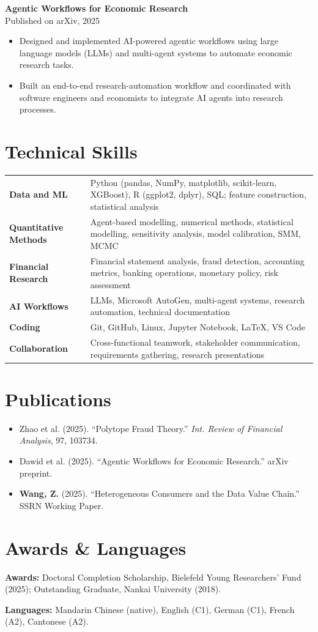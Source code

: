 \documentclass[a4paper,11pt]{article}
\newcommand{\project}[2]{%
  \textbf{#1}\\[-1pt]
  \textcolor{muted}{\small #2}\par
}
\begin{document}
\project{Agentic Workflows for Economic Research}{Published on arXiv, 2025}
\begin{itemize}
  \item Designed and implemented AI-powered agentic workflows using large language models (LLMs) and multi-agent systems to automate economic research tasks.
  \item Built an end-to-end research-automation workflow and coordinated with software engineers and economists to integrate AI agents into research processes.
\end{itemize}

\section{Technical Skills}
\begin{tabularx}{\linewidth}{@{}>{\bfseries}p{3.2cm}X@{}}
Data and ML & Python (pandas, NumPy, matplotlib, scikit-learn, XGBoost), R (ggplot2, dplyr), SQL; feature construction, statistical analysis\\
Quantitative Methods & Agent-based modelling, numerical methods, statistical modelling, sensitivity analysis, model calibration, SMM, MCMC\\
Financial Research & Financial statement analysis, fraud detection, accounting metrics, banking operations, monetary policy, risk assessment\\
AI Workflows & LLMs, Microsoft AutoGen, multi-agent systems, research automation, technical documentation\\
Coding & Git, GitHub, Linux, Jupyter Notebook, LaTeX, VS Code\\
Collaboration & Cross-functional teamwork, stakeholder communication, requirements gathering, research presentations\\
\end{tabularx}

\section{Publications}
\begin{itemize}
  \item Zhao et al. (2025). ``Polytope Fraud Theory.'' \textit{Int. Review of Financial Analysis}, 97, 103734.
  \item Dawid et al. (2025). ``Agentic Workflows for Economic Research.'' arXiv preprint.
  \item \textbf{Wang, Z.} (2025). ``Heterogeneous Consumers and the Data Value Chain.'' SSRN Working Paper.
\end{itemize}

\enlargethispage{3\baselineskip}
\section{Awards \& Languages}
\textbf{Awards:} Doctoral Completion Scholarship, Bielefeld Young Researchers' Fund (2025); Outstanding Graduate, Nankai University (2018).

\textbf{Languages:} Mandarin Chinese (native), English (C1), German (C1), French (A2), Cantonese (A2).
\end{document}

